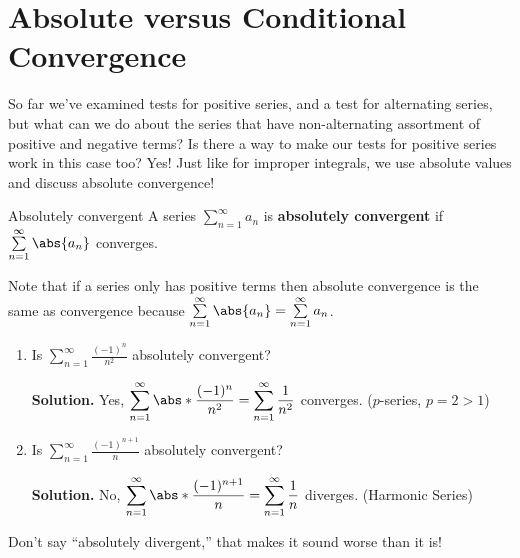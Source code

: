\section{Absolute versus Conditional Convergence}
So far we've examined tests for positive series, and a test
for alternating series, but what can we do about the series that have
non-alternating assortment of positive and negative terms?
Is there a way to make our tests for positive series work in this case too?
Yes! Just like for improper integrals, we use absolute values
and discuss absolute convergence!

\begin{Definition}{Absolutely convergent}{}
    A series $ \sum\limits_{n=1}^{\infty} a_n $ is \textbf{absolutely convergent}
    if $ \sum\limits_{n=1}^{\infty} \abs{a_n} $ converges.
\end{Definition}

\begin{Remark}{}{}
    Note that if a series only has positive terms then absolute convergence
    is the same as convergence because $ \sum\limits_{n=1}^{\infty} \abs{a_n}=
        \sum\limits_{n=1}^{\infty} a_n $.
\end{Remark}

\begin{Example}{}{}
    \begin{enumerate}[label=(\roman*)]
        \item Is $ \displaystyle \sum\limits_{n=1}^{\infty} \frac{(-1)^n}{n^2} $ absolutely
              convergent?

              \textbf{Solution.} Yes, $ \displaystyle \sum\limits_{n=1}^{\infty} \abs*{\frac{(-1)^n}{n^2}}
                  =\sum\limits_{n=1}^{\infty} \frac{1}{n^2} $ converges. ($ p $-series, $ p=2>1 $)
        \item Is $ \displaystyle \sum\limits_{n=1}^{\infty} \frac{(-1)^{n+1}}{n} $ absolutely
              convergent?

              \textbf{Solution.} No, $ \displaystyle \sum\limits_{n=1}^{\infty} \abs*{\frac{(-1)^{n+1}}{n}}=
                  \sum\limits_{n=1}^{\infty} \frac{1}{n} $ diverges. (Harmonic Series)
    \end{enumerate}
\end{Example}

\begin{Remark}{}{}
    Don't say ``absolutely divergent,'' that makes it sound worse than it is!
\end{Remark}

